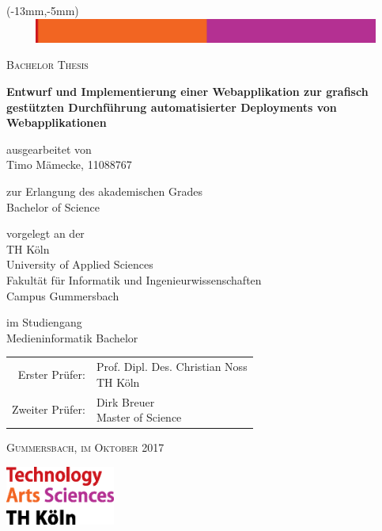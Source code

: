 \begin{titlepage}
  \enlargethispage{5cm}

  \begin{textblock*}{230mm}(-13mm,-5mm)
    \includegraphics[width=230mm,height=8mm]{./assets/topline.eps}
  \end{textblock*}


  \begin{center}
    \textsc{\Large{Bachelor Thesis}}

    \vspace{1cm}

    \LARGE{\textbf{Entwurf und Implementierung einer Webapplikation zur grafisch gestützten Durchführung automatisierter Deployments von Webapplikationen}}

    \vspace{1cm}

    \normalsize{ausgearbeitet von} \\
    \Large{Timo Mämecke, 11088767}

    \normalsize{zur Erlangung des akademischen Grades} \\
    \Large{Bachelor of Science}

    \normalsize{vorgelegt an der} \\
    \Large{TH Köln}\\
    \Large{University of Applied Sciences}\\
    \Large{Fakultät für Informatik und Ingenieurwissenschaften}\\
    \Large{Campus Gummersbach}

    \normalsize{im Studiengang} \\
    \Large{Medieninformatik Bachelor}

    \vspace{1cm}

    \large{
      \begin{tabular}{ r l }
        Erster Prüfer: & \makecell[lt]{Prof. Dipl. Des. Christian Noss\\\small{TH Köln}\vspace{0.2cm}} \\
        Zweiter Prüfer: & \makecell[lt]{Dirk Breuer\\\small{Master of Science}}
      \end{tabular}
    }

    \vspace{1cm}

    \textsc{Gummersbach, im Oktober 2017}

  \end{center}

  \vspace{\fill}

  \begin{flushright}
    \includegraphics[height=55pt]{./assets/logo_th-koeln.eps}
  \end{flushright}
\end{titlepage}
